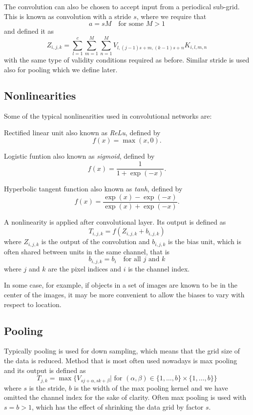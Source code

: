 \documentclass[]{article}
\begin{document}
The convolution can also be chosen to accept input from a periodical sub-grid.
This is known as convolution with a stride $s$, where we require that
\[
a = s M \quad \text{for some $M > 1$}
\]
and defined it as
\[
Z_{i, j, k} = \sum_{l=1}^c \sum_{m = 1}^M \sum_{n=1}^M
V_{l, (j -1) s + m, (k-1) s + n} K_{i, l, m, n}
\]
with the same type of validity conditions required as before. Similar stride is used
also for pooling which we define later.

\subsection{Nonlinearities}
Some of the typical nonlinearities used in convolutional networks are:

Rectified linear unit also known as \emph{ReLu}, defined by
\[
f(x) = \max(x, 0).
\]

Logistic funtion also known as \emph{sigmoid}, defined by
\[
f(x) = \frac{1}{1 + \exp(-x)}.
\]

Hyperbolic tangent function also known as \emph{tanh}, defined by
\[
f(x) = \frac{\exp(x) - \exp(-x)}{\exp(x) + \exp(-x)}.
\]

A nonlinearity is applied after convolutional layer. Its output is defined as
\[
T_{i,j,k} = f(Z_{i, j, k} + b_{i,j,k})
\]
where $Z_{i, j, k}$ is the output of the convolution and $b_{i, j, k}$ is the bias
unit, which is often shared between units in the same channel, that is
\[
b_{i, j, k} = b_i \quad \text{for all $j$ and $k$}
\]
where $j$ and $k$ are the pixel indices and $i$ is the channel index.

In some case, for example, if objects in a set of images are known to be in the
center of the images, it may be more convenient to allow the biases to vary with
respect to location.

\subsection{Pooling}
Typically pooling is used for down sampling, which means that the grid size of
the data is reduced. Method that is most often used nowadays is max pooling and
its output is defined as
\[
T_{j,k} = \max \{V_{s j + \alpha, s k + \beta} |
\text{ for $(\alpha, \beta) \in \{ 1,\ldots, b\} \times  \{ 1,\ldots, b\} $} \}
\]
where $s$ is the stride, $b$ is the width of the max pooling kernel and we have
omitted the channel index for the sake of clarity. Often max pooling is used with
$s = b > 1$, which has the effect of shrinking the data grid by factor $s$.
\end{document}
